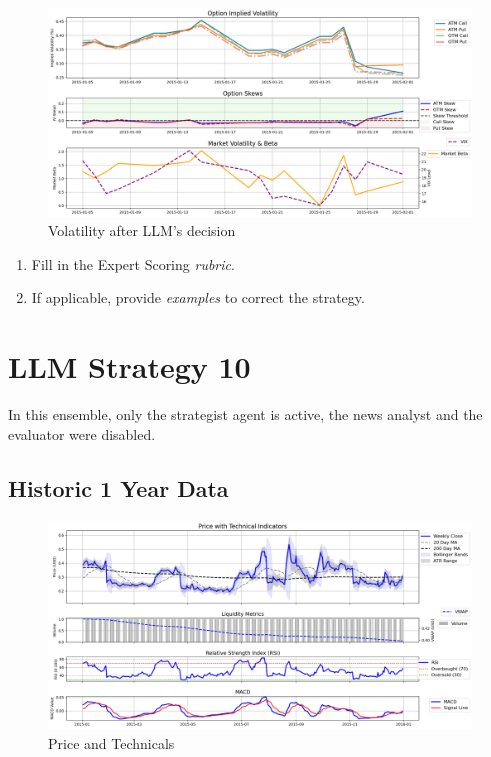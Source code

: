 \documentclass[8pt]{scrartcl}
\begin{document}
\begin{figure}[H]
    \centering
    \includegraphics[width=1\linewidth]{judge_reviews/AAPL_M_gpt-4o-mini/2015-01-01/llm_Market_Volatility_&_Beta.png}
    \caption{Volatility after LLM's decision}
\end{figure}

\begin{tcolorbox}[colback=blue!10, colframe=blue!60, title=\textbf{TASKS}, sharp corners=southwest]
\begin{enumerate}
    \item Fill in the Expert Scoring \textit{rubric}.
    \item If applicable, provide \textit{examples} to correct the strategy.
\end{enumerate}
\end{tcolorbox}
\newpage


\section*{LLM Strategy 10}
\label{app:s10}

In this ensemble, only the strategist agent is active, the news analyst and the evaluator were disabled.

\subsection*{Historic 1 Year Data}

\begin{figure}[H]
    \centering
    \includegraphics[width=1\linewidth]{judge_reviews//META_M_gpt-4o-mini//2016-01-01/judge_Price_with_Technical_Indicators.png}
    \caption{Price and Technicals}
\end{figure}
\end{document}

